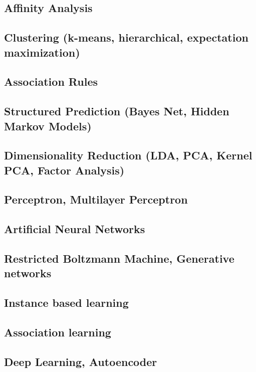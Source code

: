 \subsection{Affinity Analysis}

\subsection{Clustering (k-means, hierarchical, expectation maximization)}

\subsection{Association Rules}

\subsection{Structured Prediction (Bayes Net, Hidden Markov Models)}

\subsection{Dimensionality Reduction (LDA, PCA, Kernel PCA, Factor Analysis)}

\subsection{Perceptron, Multilayer Perceptron}

\subsection{Artificial Neural Networks}

\subsection{Restricted Boltzmann Machine, Generative networks}

\subsection{Instance based learning}

\subsection{Association learning}

\subsection{Deep Learning, Autoencoder}

